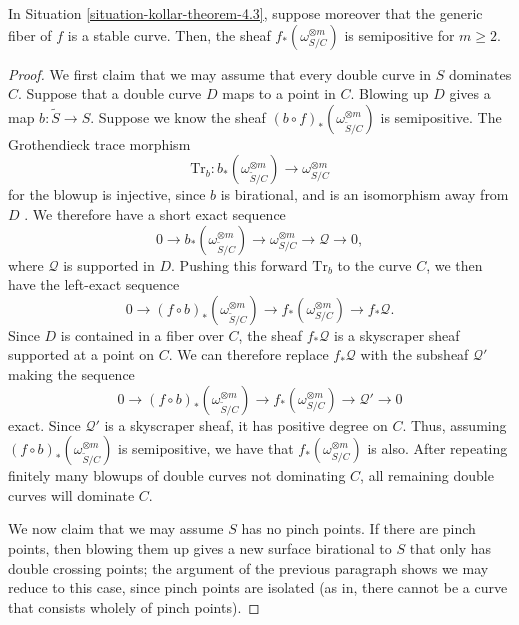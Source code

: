 \begin{theorem}
\label{theorem-kollar-theorem-4.3}
In Situation \ref{situation-kollar-theorem-4.3}, suppose moreover that the
generic fiber of $f$ is a stable curve. Then,
the sheaf $f_*(\omega_{S/C}^{\otimes m})$ is semipositive for $m \ge 2$.
\end{theorem}
\begin{proof}
We first claim that we may assume that every double curve in $S$ dominates $C$.
Suppose that a double curve $D$ maps to a point in $C$.
Blowing up $D$ gives a map $b :
\widetilde{S} \to S$.
Suppose we know the sheaf $(b \circ f)_*(\omega_{\widetilde{S}/C}^{\otimes m})$
is semipositive.
The Grothendieck trace morphism
$$
\mathrm{Tr}_b : b_*(\omega_{\widetilde{S}/C}^{\otimes m})
\longrightarrow \omega_{S/C}^{\otimes m}
$$
for the blowup is injective, since $b$ is birational, and is an isomorphism away
from $D$ \cite[Prop.\ 5.77]{km}.
We therefore have a short exact sequence
$$
0 \longrightarrow b_*(\omega_{\widetilde{S}/C}^{\otimes m})
\longrightarrow \omega_{S/C}^{\otimes m} \longrightarrow \mathcal{Q}
\longrightarrow 0,
$$
where $\mathcal{Q}$ is supported in $D$.
Pushing this forward $\mathrm{Tr}_b$ to the curve $C$, we then have the
left-exact sequence
$$
0 \longrightarrow (f \circ b)_*(\omega_{\widetilde{S}/C}^{\otimes m})
\longrightarrow f_*(\omega_{S/C}^{\otimes m}) \longrightarrow f_*\mathcal{Q}.
$$
Since $D$ is contained in a fiber over $C$, the sheaf $f_*\mathcal{Q}$ is a
skyscraper sheaf supported at a point on $C$.
We can therefore replace $f_*\mathcal{Q}$ with the subsheaf $\mathcal{Q}'$
making the sequence
$$
0 \longrightarrow (f \circ b)_*(\omega_{\widetilde{S}/C}^{\otimes m})
\longrightarrow f_*(\omega_{S/C}^{\otimes m}) \longrightarrow \mathcal{Q}'
\longrightarrow 0
$$
exact.
Since $\mathcal{Q}'$ is a skyscraper sheaf, it has positive degree on $C$.
Thus, assuming $(f \circ b)_*(\omega_{\widetilde{S}/C}^{\otimes m})$ is
semipositive, we have that $f_*(\omega_{S/C}^{\otimes m})$ is also.
After repeating finitely many blowups of double curves not dominating $C$,
all remaining double curves will dominate $C$.

We now claim that we may assume $S$ has no pinch points. If there are pinch
points, then blowing them up gives a new surface birational to $S$ that only has
double crossing points; the argument of the previous paragraph shows we may
reduce to this case, since pinch points are isolated (as in, there cannot be a
curve that consists wholely of pinch points).


\end{proof}
